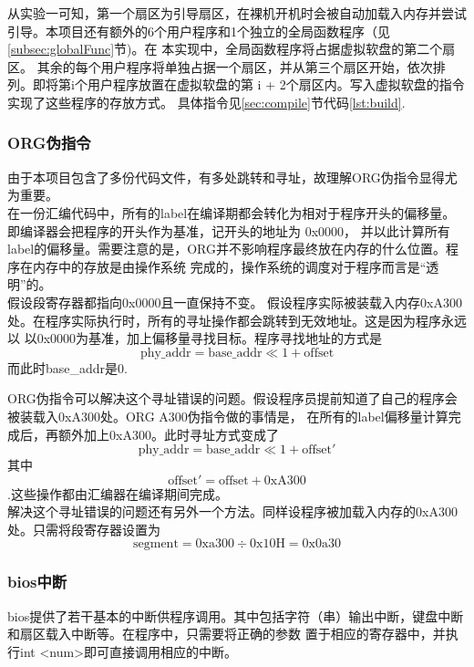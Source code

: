 \documentclass[a4paper]{article}
\newcommand{\codev}[1]{\textsf{#1}}
\begin{document}
    从实验一可知，第一个扇区为引导扇区，在裸机开机时会被自动加载入内存并尝试引导。本项目还有额外的6个用户程序和1个独立的全局函数程序（见
    \ref{subsec:globalFunc}节)。在
    本实现中，全局函数程序将占据虚拟软盘的第二个扇区。
    其余的每个用户程序将单独占据一个扇区，并从第三个扇区开始，依次排列。即将第\codev{i}个用户程序放置在虚拟软盘的第
    \codev{i + 2}个扇区内。写入虚拟软盘的指令实现了这些程序的存放方式。
    具体指令见\ref{sec:compile}节代码\ref{lst:build}.
    \subsubsection{ORG伪指令} \label{subsec:org}
    由于本项目包含了多份代码文件，有多处跳转和寻址，故理解ORG伪指令显得尤为重要。 \\
    
    在一份汇编代码中，所有的label在编译期都会转化为相对于程序开头的偏移量。即编译器会把程序的开头作为基准，记开头的地址为
    0x0000，
    并以此计算所有label的偏移量。需要注意的是，ORG并不影响程序最终放在内存的什么位置。程序在内存中的存放是由操作系统
    完成的，操作系统的调度对于程序而言是``透明''的。\\
    
    假设段寄存器都指向0x0000且一直保持不变。
    假设程序实际被装载入内存0xA300处。在程序实际执行时，所有的寻址操作都会跳转到无效地址。这是因为程序永远以
    以0x0000为基准，加上偏移量寻找目标。程序寻找地址的方式是$$ \text{phy\_addr} = \text{base\_addr} \ll 1 + \text{offset} $$
    而此时base\_addr是0.
    
    ORG伪指令可以解决这个寻址错误的问题。假设程序员提前知道了自己的程序会被装载入0xA300处。ORG A300伪指令做的事情是，
    在所有的label偏移量计算完成后，再额外加上0xA300。此时寻址方式变成了
    \[ \text{phy\_addr} = \text{base\_addr} \ll 1 + \text{offset}' \]
    其中 $$ \text{offset}' = \text{offset} + \text{0xA300} $$.这些操作都由汇编器在编译期间完成。\\
    
    解决这个寻址错误的问题还有另外一个方法。同样设程序被加载入内存的0xA300处。只需将段寄存器设置为
    $$\text{segment} = \text{0xa300} \div \text{0x10H} = \text{0x0a30} $$

    \subsubsection{bios中断}
    bios提供了若干基本的中断供程序调用。其中包括字符（串）输出中断，键盘中断和扇区载入中断等。在程序中，只需要将正确的参数
    置于相应的寄存器中，并执行\codev{int <num>}即可直接调用相应的中断。
\end{document}
